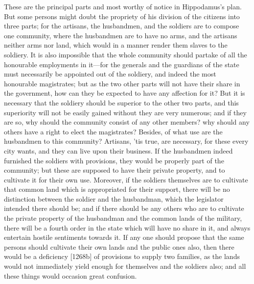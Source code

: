 These are the principal parts and most worthy of notice in Hippodamus's
plan. But some persons might doubt the propriety of his division of the
citizens into three parts; for the artisans, the husbandmen, and the
soldiers are to compose one community, where the husbandmen are to have no
arms, and the artisans neither arms nor land, which would in a manner
render them slaves to the soldiery. It is also impossible that the whole
community should partake of all the honourable employments in it—for
the generals and the guardians of the state must necessarily be appointed
out of the soldiery, and indeed the most honourable magistrates; but as
the two other parts will not have their share in the government, how can
they be expected to have any affection for it? But it is necessary that
the soldiery should be superior to the other two parts, and this
superiority will not be easily gained without they are very numerous; and
if they are so, why should the community consist of any other members? why
should any others have a right to elect the magistrates? Besides, of what
use are the husbandmen to this community? Artisans, 'tis true, are
necessary, for these every city wants, and they can live upon their
business. If the husbandmen indeed furnished the soldiers with provisions,
they would be properly part of the community; but these are supposed to
have their private property, and to cultivate it for their own use.
Moreover, if the soldiers themselves are to cultivate that common land
which is appropriated for their support, there will be no distinction
between the soldier and the husbandman, which the legislator intended
there should be; and if there should be any others who are to cultivate
the private property of the husbandman and the common lands of the
military, there will be a fourth order in the state which will have no
share in it, and always entertain hostile sentiments towards it. If any
one should propose that the same persons should cultivate their own lands
and the public ones also, then there would be a deficiency [1268b] of
provisions to supply two families, as the lands would not immediately
yield enough for themselves and the soldiers also; and all these things
would occasion great confusion.

